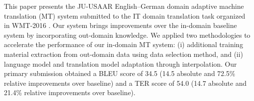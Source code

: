 This paper presents the JU-USAAR English--German domain adaptive machine translation (MT) system submitted to the IT domain translation task organized in WMT-2016 . Our system brings improvements over the in-domain baseline system by incorporating out-domain knowledge. We applied two methodologies to accelerate the performance of our in-domain MT system: (i) additional training material extraction from out-domain data using data selection method, and (ii) language model and translation model adaptation through interpolation. Our primary submission obtained a BLEU score of 34.5 (14.5 absolute and 72.5\% relative improvements over baseline) and a TER score of 54.0 (14.7 absolute and 21.4\% relative improvements over baseline).

